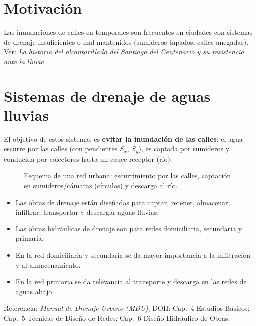 
\section{Motivación}
Las inundaciones de calles en temporales son frecuentes en ciudades con
sistemas de drenaje insuficientes o mal mantenidos (sumideros tapados, calles
anegadas). Ver: \emph{La historia del alcantarillado del Santiago del
Centenario y su resistencia ante la lluvia}.

\section{Sistemas de drenaje de aguas lluvias}
El objetivo de estos sistemas es \textbf{evitar la inundación de las calles}:
el agua escurre por las calles (con pendientes $S_x$, $S_y$), es captada por
sumideros y conducida por colectores hasta un cauce receptor (río).

\begin{figure}[H]
\centering
{}
\caption{Esquema de una red urbana: escurrimiento por las calles, captación
en sumideros/cámaras (círculos) y descarga al río.}
\end{figure}

\begin{itemize}
  \item Las obras de drenaje están diseñadas para captar, retener, almacenar,
        infiltrar, transportar y descargar aguas lluvias.
  \item Las obras hidráulicas de drenaje son para redes domiciliaria,
        secundaria y primaria.
  \item En la red domiciliaria y secundaria se da mayor importancia a la
        infiltración y al almacenamiento.
  \item En la red primaria se da relevancia al transporte y descarga en las
        redes de aguas abajo.
\end{itemize}
Referencia: \emph{Manual de Drenaje Urbano (MDU)}, DOH: Cap.~4 Estudios
Básicos; Cap.~5 Técnicas de Diseño de Redes; Cap.~6 Diseño Hidráulico de Obras.

